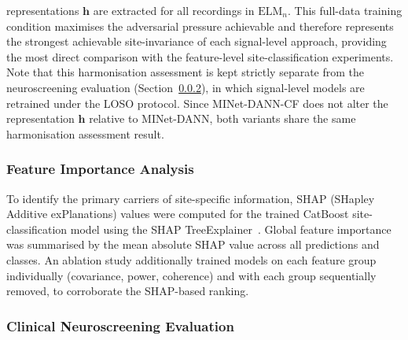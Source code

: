 \documentclass[preprint,12pt]{elsarticle}
\begin{document}
representations $\mathbf{h}$ are extracted for all recordings
in $\mathrm{ELM}_n$.
This full-data training condition maximises the adversarial pressure
achievable and therefore represents the strongest achievable
site-invariance of each signal-level approach, providing the most
direct comparison with the feature-level site-classification
experiments.
Note that this harmonisation assessment is kept strictly separate
from the neuroscreening evaluation
(Section~\ref{subsubsec:clinical_eval}), in which signal-level
models are retrained under the LOSO protocol.
Since \mbox{MINet-DANN-CF} does not alter the representation
$\mathbf{h}$ relative to \mbox{MINet-DANN}, both variants share
the same harmonisation assessment result.

\subsubsection{Feature Importance Analysis}
\label{subsubsec:shap}

To identify the primary carriers of site-specific information,
SHAP (SHapley Additive exPlanations) values were computed for the
trained CatBoost site-classification model using the SHAP
TreeExplainer~\cite{lundberg2017unified}.
Global feature importance was summarised by the mean absolute SHAP
value across all predictions and classes.
An ablation study additionally trained models on each feature group
individually (covariance, power, coherence) and with each group
sequentially removed, to corroborate the SHAP-based ranking.



\subsubsection{Clinical Neuroscreening Evaluation}
\label{subsubsec:clinical_eval}
\end{document}
